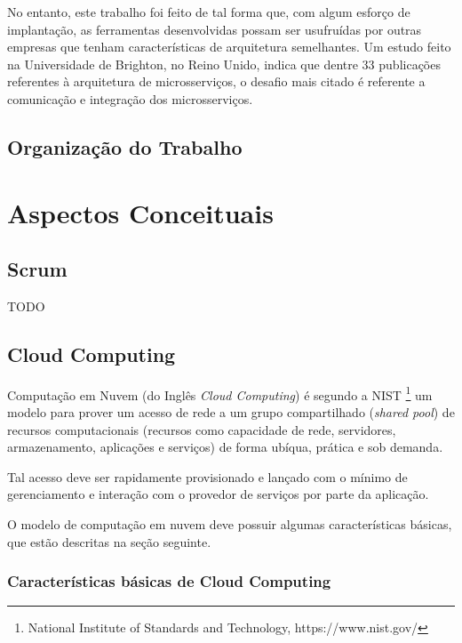 \documentclass[twosideprint]{politex}
\begin{document}
	No entanto, este trabalho foi feito de tal forma que, com algum esforço de implantação, as ferramentas desenvolvidas possam ser usufruídas por outras empresas que tenham características de arquitetura semelhantes. Um estudo feito na Universidade de Brighton, no Reino Unido, indica que dentre 33 publicações referentes à arquitetura de microsserviços, o desafio mais citado é referente a comunicação e integração dos microsserviços.\cite{systematicmapping}
	\section{Organização do Trabalho}
	
\chapter{Aspectos Conceituais}
    \section{Scrum}
    \cite{essentialscrum}
    TODO

	\section{Cloud Computing}
	Computação em Nuvem (do Inglês \textit{Cloud Computing}) é segundo a NIST \footnote{National Institute of Standards and Technology, https://www.nist.gov/} um modelo para prover um acesso de rede a um grupo compartilhado (\textit{shared pool}) de recursos computacionais (recursos como capacidade de rede, servidores, armazenamento, aplicações e serviços) de forma ubíqua, prática e sob demanda.

Tal acesso deve ser rapidamente provisionado e lançado com o mínimo de gerenciamento e interação com o provedor de serviços por parte da aplicação.

O modelo de computação em nuvem deve possuir algumas características básicas, que estão descritas na seção seguinte.

\subsection{Características básicas de Cloud Computing}
\end{document}
